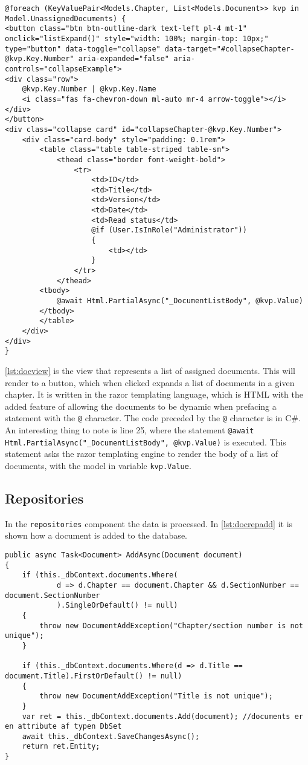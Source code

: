 \begin{lstlisting}[caption={Document View: Index}, label={lst:docview}]
@foreach (KeyValuePair<Models.Chapter, List<Models.Document>> kvp in Model.UnassignedDocuments) {
<button class="btn btn-outline-dark text-left pl-4 mt-1" onclick="listExpand()" style="width: 100%; margin-top: 10px;" type="button" data-toggle="collapse" data-target="#collapseChapter-@kvp.Key.Number" aria-expanded="false" aria-controls="collapseExample">
<div class="row">
	@kvp.Key.Number | @kvp.Key.Name
	<i class="fas fa-chevron-down ml-auto mr-4 arrow-toggle"></i>
</div>
</button>
<div class="collapse card" id="collapseChapter-@kvp.Key.Number">
	<div class="card-body" style="padding: 0.1rem">
		<table class="table table-striped table-sm">
			<thead class="border font-weight-bold">
				<tr>
					<td>ID</td>
					<td>Title</td>
					<td>Version</td>
					<td>Date</td>
					<td>Read status</td>
					@if (User.IsInRole("Administrator"))
					{
						<td></td>
					}
				</tr>
			</thead>
		<tbody>
			@await Html.PartialAsync("_DocumentListBody", @kvp.Value)
		</tbody>
		</table>
	</div>
</div>
}

\end{lstlisting}

\cref{lst:docview} is the view that represents a list of assigned documents.
This will render to a button, which when clicked expands a list of documents in a given chapter.
It is written in the razor templating language, which is HTML with the added feature of allowing the documents to be dynamic when prefacing a statement with the \texttt{@} character.
The code preceded by the \texttt{@} character is in C\#.
An interesting thing to note is line 25, where the statement \texttt{@await Html.PartialAsync("_DocumentListBody", @kvp.Value)} is executed.
This statement asks the razor templating engine to render the body of a list of documents, with the model in variable \texttt{kvp.Value}.

\subsection{Repositories}\label{sec:repositories}

In the \texttt{repositories} component the data is processed.
In \cref{lst:docrepadd} it is shown how a document is added to the database.

\begin{lstlisting}[caption={Document repository: AddAsync}, label={lst:docrepadd}]
public async Task<Document> AddAsync(Document document)
{
	if (this._dbContext.documents.Where(
			d => d.Chapter == document.Chapter && d.SectionNumber == document.SectionNumber
			).SingleOrDefault() != null)
	{
		throw new DocumentAddException("Chapter/section number is not unique");
	}

	if (this._dbContext.documents.Where(d => d.Title == document.Title).FirstOrDefault() != null)
	{
		throw new DocumentAddException("Title is not unique");
	}
	var ret = this._dbContext.documents.Add(document); //documents er en attribute af typen DbSet
	await this._dbContext.SaveChangesAsync();
	return ret.Entity;
}
\end{lstlisting}


